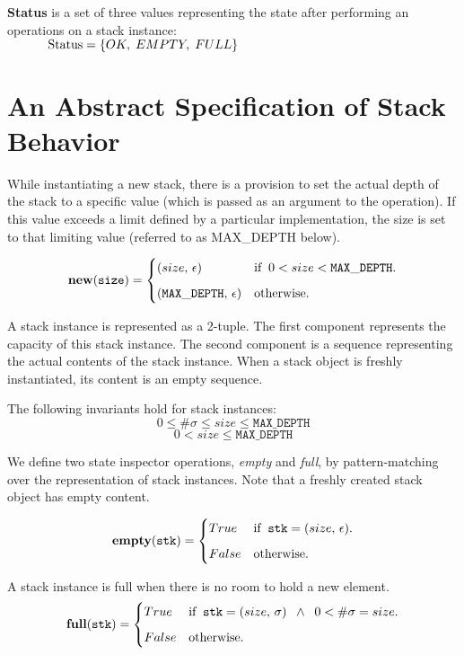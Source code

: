 \documentclass[10pt]{article}
\begin{document}
  \textbf{Status} is a set of three values representing the state after performing an operations on a stack instance: 
   \vspace*{6pt}\\\(\hspace*{32pt}\mathrm{Status} = \{OK, \; EMPTY, \; FULL\} \)

  \section{An Abstract Specification of Stack Behavior}
    While instantiating a new stack, there is a provision to set the actual depth of the stack to a specific value (which is passed as an argument to the operation). If this value exceeds a limit defined by a particular implementation, the size is set to that limiting value (referred to as MAX\_DEPTH below).

    \[
        \mathtt{\mathbf{new}(size)} = \begin{cases} (size, \,  \epsilon) &\mbox{if\;\;} 0 < size < \mathtt{MAX\_DEPTH}. \vspace*{6pt}\\ 
        (\mathtt{MAX\_DEPTH}, \, \epsilon) & \mbox{otherwise}. \end{cases} 
    \]
    
    A stack instance is represented as a 2-tuple. The first component represents the capacity of this stack instance. The second component is a sequence representing the actual contents of the stack instance. When a stack object is freshly instantiated, its content is an empty sequence. 

    The following invariants hold for stack instances:
    \[
        0 \leq \#\sigma \leq size \leq \mathtt{MAX\_DEPTH}
    \]
    \[
        0 < size \leq \mathtt{MAX\_DEPTH}
    \]

    We define two state inspector operations, \emph{empty} and \emph{full}, by pattern-matching over the representation of stack instances. Note that a freshly created stack object has empty content.
    
    \[
        \mathtt{\mathbf{empty}(stk)} = \begin{cases} True & \mbox{if\;\;} \mathtt{stk} = (size, \,\epsilon). \vspace*{6pt}\\ 
        False & \mbox{otherwise}. \end{cases} 
    \]
  
    A stack instance is full when there is no room to hold a new element.
    \[
        \mathtt{\mathbf{full}(stk)} = \begin{cases} True & \mbox{if\;\;} \mathtt{stk} = (size, \,\sigma) \;\; \wedge \;\; 0 < \#\sigma = size. \vspace*{6pt}\\
        False & \mbox{otherwise}. \end{cases} 
    \]
\end{document}
